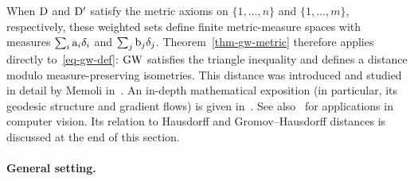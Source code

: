 When $\mathrm{D}$ and $\mathrm{D}'$ satisfy the metric axioms on $\{1,\ldots,n\}$ and $\{1,\ldots,m\}$, respectively, these weighted sets define finite metric-measure spaces with measures $\sum_i\mathrm{a}_i\delta_i$ and $\sum_j\mathrm{b}_j\delta_j$. Theorem~\ref{thm-gw-metric} therefore applies directly to~\eqref{eq-gw-def}: $\operatorname{\mathrm{GW}}$ satisfies the triangle inequality and defines a distance modulo measure-preserving isometries.
%
This distance was introduced and studied in detail by Memoli in~\cite{memoli-2011}. An in-depth mathematical exposition (in particular, its geodesic structure and gradient flows) is given in~\cite{SturmGW}. See also~\cite{schmitzer2013modelling} for applications in computer vision.
%
Its relation to Hausdorff and Gromov--Hausdorff distances is discussed at the end of this section.

\paragraph{General setting.}

